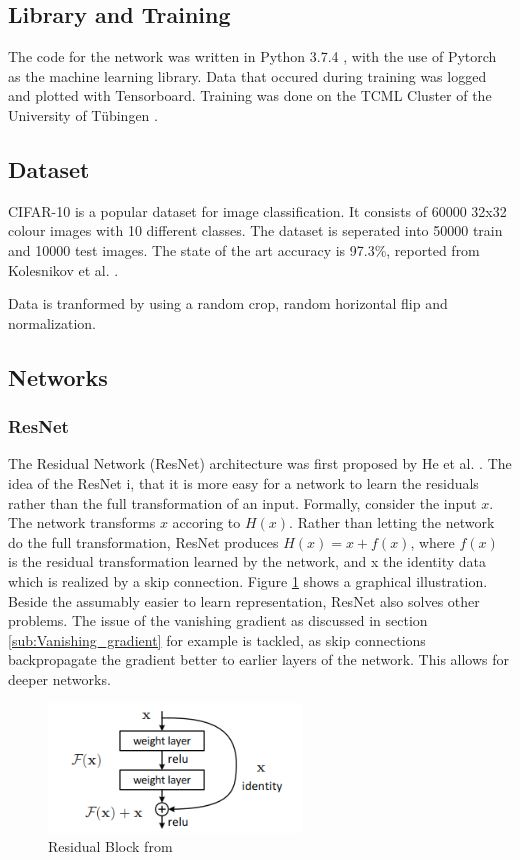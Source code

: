 \subsection{Library and Training}
The code for the network was written in Python 3.7.4 , with the use of Pytorch
\cite{NEURIPS2019_9015} as the machine learning library. Data that occured
during training was logged and plotted with Tensorboard. Training was done on
the TCML Cluster of the University of Tübingen \cite{TCML}.

\subsection{Dataset}\label{sub:Dataset}
CIFAR-10 \cite{CIFAR-10} is a popular dataset for image classification. It
consists of 60000 32x32 colour images with 10 different classes. The dataset is
seperated into 50000 train and 10000 test images. The state of the art accuracy
is 97.3\%, reported from Kolesnikov et al. \cite{kolesnikov2019big}.

Data is tranformed by using a random crop, random horizontal flip and
normalization.


\subsection{Networks}
\subsubsection{ResNet}\label{sub:ResNet}
The Residual Network (ResNet) architecture was first proposed by He et al.
\cite{he2016deep}. The idea of the ResNet i, that it is more easy for a
network to learn the residuals rather than the full transformation of an input.
Formally, consider the input $x$. The network transforms $x$ accoring to $H(x)$.
Rather than letting the network do the full transformation, ResNet produces
$H(x)= x +f(x)$, where $f(x)$ is the residual transformation learned by the
network, and x the identity data which is realized by a skip connection. Figure
\ref{fig:Residual_Block} shows a graphical illustration. Beside the assumably
easier to learn representation, ResNet also solves other problems. The issue of
the vanishing gradient as discussed in section \ref{sub:Vanishing_gradient} for
example is tackled, as skip connections backpropagate the gradient better to
earlier layers of the network. This allows for deeper networks.

\begin{figure}[h]\label{fig:Residual_Block}
    \centering
    \includegraphics[width=0.6\textwidth]{images/Residual_Block.png}
    \caption{Residual Block from \cite[Page 2]{he2016deep}}
\end{figure}

